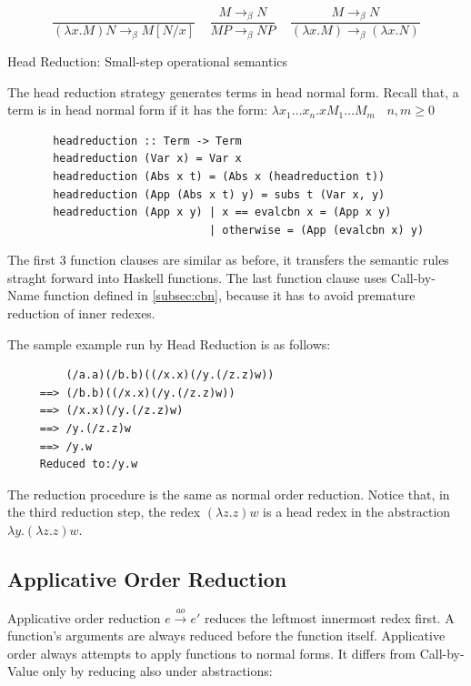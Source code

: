 \documentclass[a4paper,11pt,twoside]{report}
\begin{document}
\begin{equation*}
\frac{}{(\lambda x.M)N \rightarrow _\beta M[N/x]}\ \ \ \ \  
\frac{M \rightarrow _\beta N}{MP \rightarrow _\beta NP}\ \ \ \ \ 
\frac{M \rightarrow _\beta N}{(\lambda x.M) \rightarrow _\beta (\lambda x.N)}
\end{equation*}
\begin{center}
Head Reduction: Small-step operational semantics
\end{center}

The head reduction strategy generates terms in head normal form. Recall that, a term is in head normal form if it has the form: $\lambda x_1\ldots x_n.xM_1\ldots M_m\ \ \ \ n,m\geqslant 0$

\begin{verbatim}
       headreduction :: Term -> Term
       headreduction (Var x) = Var x
       headreduction (Abs x t) = (Abs x (headreduction t))
       headreduction (App (Abs x t) y) = subs t (Var x, y)
       headreduction (App x y) | x == evalcbn x = (App x y)
                               | otherwise = (App (evalcbn x) y)  
\end{verbatim}

The first 3 function clauses are similar as before, it transfers the semantic rules straght forward into Haskell functions. The last function clause uses Call-by-Name function defined in \ref{subsec:cbn}, because it has to avoid premature reduction of inner redexes. 


The sample example run by Head Reduction is as follows:

\begin{verbatim}
         (/a.a)(/b.b)((/x.x)(/y.(/z.z)w))
     ==> (/b.b)((/x.x)(/y.(/z.z)w))
     ==> (/x.x)(/y.(/z.z)w)
     ==> /y.(/z.z)w
     ==> /y.w
     Reduced to:/y.w
\end{verbatim}

The reduction procedure is the same as normal order reduction. Notice that, in the third reduction step, the redex $(\lambda z.z)w$ is a head redex in the abstraction $\lambda y.(\lambda z.z)w$. 

\subsection{Applicative Order Reduction}

Applicative order reduction $e\xrightarrow{ao} e'$ reduces the leftmost innermost redex first. A function's arguments are always reduced before the function itself. Applicative order always attempts to apply functions to normal forms. It differs from Call-by-Value only by reducing also under abstractions:
\end{document}

